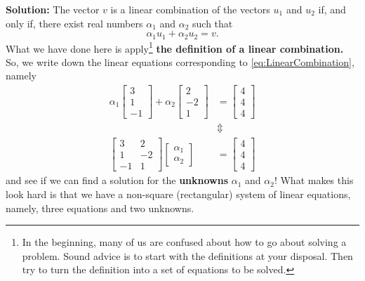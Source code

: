 \textbf{Solution:} The vector $v$ is a linear combination of the vectors $u_1$ and $u_2$ if, and only if, there exist real numbers $\alpha_1$ and $\alpha_2$ such that
\begin{equation}
\label{eq:LinearCombination}
   \alpha_1 u_1 + \alpha_2 u_2 = v. 
\end{equation} 
What we have done here is apply\footnote{In the beginning, many of us are confused about how to go about solving a problem. Sound advice is to start with the definitions at your disposal. Then try to turn the definition into a set of equations to be solved.} \textbf{the definition of a linear combination.}
So, we write down the linear equations corresponding to \eqref{eq:LinearCombination}, namely
\begin{equation}
\label{eq:CheckLinearCombinationEquations}
\begin{aligned}
    \alpha_1 \left[ \begin{array}{r} 3 \\ 1 \\ -1   \end{array} \right] + \alpha_2 \left[ \begin{array}{r} 2 \\ -2 \\ 1   \end{array} \right] &= \left[ \begin{array}{r} 4 \\ 4 \\ 4   \end{array} \right]\\
   & \Updownarrow \\
    \left[ \begin{array}{rr} 3 & 2\\ 1  & -2\\ -1  & 1 \end{array} \right]  \left[ \begin{array}{r} \alpha_1 \\ \alpha_2 \end{array} \right] &= \left[ \begin{array}{r} 4 \\ 4 \\ 4   \end{array} \right]
\end{aligned}
\end{equation}
and see if we can find a solution for the \textbf{unknowns} $\alpha_1$ and $\alpha_2$! What makes this look hard is that we have a non-square (rectangular) system of linear equations, namely, three equations and two unknowns.\\

